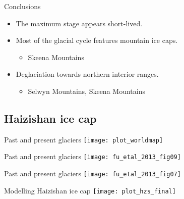     \begin{frame}{Conclusions}
      \begin{itemize}
        \item The maximum stage appears short-lived.
        \bigskip
        \item Most of the glacial cycle features mountain ice caps.
          \begin{itemize}
            \item Skeena Mountains
          \end{itemize}
        \bigskip
        \item Deglaciation towards northern interior ranges.
          \begin{itemize}
            \item Selwyn Mountains, Skeena Mountains
          \end{itemize}
      \end{itemize}
    \end{frame}

\subsection{Haizishan ice cap}

    \begin{frame}{Past and present glaciers}
      \centering
      \texttt{[image: plot\_worldmap]}
    \end{frame}

    \begin{frame}{Past and present glaciers}
      \centering
      \texttt{[image: fu\_etal\_2013\_fig09]}
    \end{frame}

    \begin{frame}{Past and present glaciers}
      \centering
      \texttt{[image: fu\_etal\_2013\_fig07]}
    \end{frame}

    \begin{frame}{Modelling Haizishan ice cap}
      \centering
      \texttt{[image: plot\_hzs\_final]}
    \end{frame}

